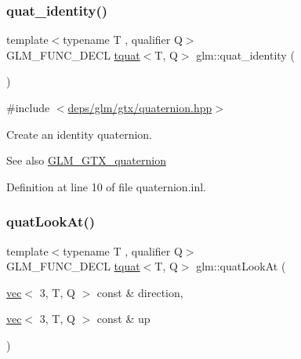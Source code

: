 \mbox{\label{group__gtx__quaternion_ga40788ce1d74fac29fa000af893a3ceb5}} 
\subsubsection{\texorpdfstring{quat\+\_\+identity()}{quat\_identity()}}
{\footnotesize\ttfamily template$<$typename T , qualifier Q$>$ \\
G\+L\+M\+\_\+\+F\+U\+N\+C\+\_\+\+D\+E\+CL \hyperlink{structglm_1_1tquat}{tquat}$<$T, Q$>$ glm\+::quat\+\_\+identity (\begin{DoxyParamCaption}{ }\end{DoxyParamCaption})}



{\ttfamily \#include $<$\hyperlink{gtx_2quaternion_8hpp}{deps/glm/gtx/quaternion.\+hpp}$>$}

Create an identity quaternion.

\begin{DoxySeeAlso}{See also}
\hyperlink{group__gtx__quaternion}{G\+L\+M\+\_\+\+G\+T\+X\+\_\+quaternion} 
\end{DoxySeeAlso}


Definition at line 10 of file quaternion.\+inl.

\mbox{\label{group__gtx__quaternion_ga668d9ec9964ced2b455d416677e1e8b9}} 
\subsubsection{\texorpdfstring{quat\+Look\+At()}{quatLookAt()}}
{\footnotesize\ttfamily template$<$typename T , qualifier Q$>$ \\
G\+L\+M\+\_\+\+F\+U\+N\+C\+\_\+\+D\+E\+CL \hyperlink{structglm_1_1tquat}{tquat}$<$T, Q$>$ glm\+::quat\+Look\+At (\begin{DoxyParamCaption}\item[{\hyperlink{structglm_1_1vec}{vec}$<$ 3, T, Q $>$ const \&}]{direction,  }\item[{\hyperlink{structglm_1_1vec}{vec}$<$ 3, T, Q $>$ const \&}]{up }\end{DoxyParamCaption})}



